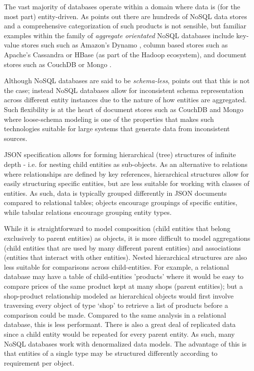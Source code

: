 The vast majority of databases operate within a domain where data is (for the most part) entity-driven. As \cite{GANESHCHANDRA201513} points out there are hundreds of NoSQL data stores and a comprehensive categorization of such products is not sensible, but familiar examples within the family of \textit{aggregate orientated} NoSQL databases include key-value stores such such as Amazon's Dynamo \cite{sadalage2012}, column based stores such as Apache's Cassandra \cite{sadalage2012} or HBase \cite{sadalage2012} (as part of the Hadoop ecosystem), and document stores such as CouchDB or Mongo \cite{sadalage2012}.

Although NoSQL databases are said to be \textit{schema-less}, \cite{ATZENI2016} points out that this is not the case; instead NoSQL databases allow for inconsistent schema representation across different entity instances due to the nature of how entities are aggregated. Such flexibility is at the heart of document stores such as CouchDB and Mongo where loose-schema modeling is one of the properties that makes such technologies suitable for large systems that generate data from inconsistent sources.

JSON specification allows for forming hierarchical (tree) structures of infinite depth - i.e. for nesting child entities as sub-objects. As an alternative to relations where relationships are defined by key references, hierarchical structures allow for easily structuring specific entities, but are less suitable for working with classes of entities. As such, data is typically grouped differently in JSON documents compared to relational tables; objects encourage groupings of specific entities, while tabular relations encourage grouping entity types.

While it is straightforward to model composition (child entities that belong exclusively to parent entities) as objects, it is more difficult to model aggregations (child entities that are used by many different parent entities) and associations (entities that interact with other entities). Nested hierarchical structures are also less suitable for comparisons across child-entities. For example, a relational database may have a table of child-entities 'products' where it would be easy to compare prices of the same product kept at many shops (parent entities); but a shop-product relationship modeled as hierarchical objects would first involve traversing every object of type `shop' to retrieve a list of products before a comparison could be made. Compared to the same analysis in a relational database, this is less performant. There is also a great deal of replicated data since a child entity would be repeated for every parent entity. As such, many NoSQL databases work with denormalized data models. The advantage of this is that entities of a single type may be structured differently according to requirement per object.

